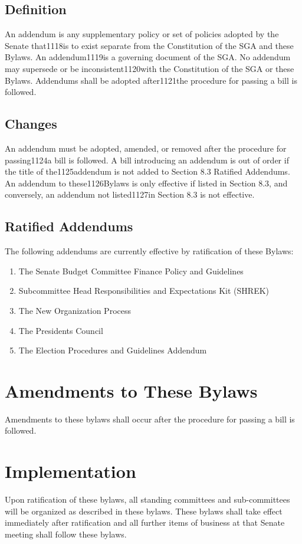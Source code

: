 \documentclass[12pt]{scrreprt}
\begin{document}
\section{Definition}
An addendum is any supplementary policy or set of policies adopted by the Senate that1118is to exist separate from the Constitution of the SGA and these Bylaws.  An addendum1119is a governing document of the SGA. No addendum may supersede or be inconsistent1120with the Constitution of the SGA or these Bylaws.  Addendums shall be adopted after1121the procedure for passing a bill is followed.

\section{Changes}
An addendum must be adopted, amended, or removed after the procedure for passing1124a  bill  is  followed.   A  bill  introducing  an  addendum  is  out  of  order  if  the  title  of  the1125addendum  is  not  added  to  Section  8.3  Ratified  Addendums.   An  addendum  to  these1126Bylaws is only effective if listed in Section 8.3, and conversely, an addendum not listed1127in Section 8.3 is not effective.

\section{Ratified Addendums}
The following addendums are currently effective by ratification of these Bylaws:
\begin{enumerate}
    \item The Senate Budget Committee Finance Policy and Guidelines
    \item  Subcommittee Head Responsibilities and Expectations Kit (SHREK)
    \item The New Organization Process 
    \item  The Presidents Council
    \item The Election Procedures and Guidelines Addendum
\end{enumerate}


\chapter{Amendments to These Bylaws} \label{sec:amendments}
Amendments to these bylaws shall occur after the procedure for passing a bill 
is followed. 

\chapter{Implementation}
Upon ratification of these bylaws, all standing committees and sub-committees 
will be organized as described in these bylaws. These bylaws shall take effect 
immediately after ratification and all further items of business at that 
Senate meeting shall follow these bylaws. 
\end{document}
